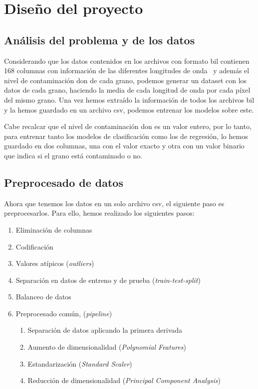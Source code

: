 \section{Diseño del proyecto}

\subsection{Análisis del problema y de los datos}\label{sec:obtencion}

Considerando que los datos contenidos en los archivos con formato \gls{bil} contienen 168 columnas con información de las diferentes longitudes de onda\ \cite{WhatIsHy18:online} y además el nivel de contaminación \gls{don} de cada grano, podemos generar un \gls{dataset} con los datos de cada grano, haciendo la media de cada longitud de onda por cada píxel del mismo grano. Una vez hemos extraído la información de todos los archivos \gls{bil} y la hemos guardado en un archivo \acrshort{csv}, podemos entrenar los modelos sobre este.

Cabe recalcar que el nivel de contaminación \gls{don} es un valor entero, por lo tanto, para entrenar tanto los modelos de clasificación como los de regresión, lo hemos guardado en dos columnas, una con el valor exacto y otra con un valor binario que indica si el grano está contaminado o no.

\subsection{Preprocesado de datos}\label{sec:preprocesado}

Ahora que tenemos los datos en un solo archivo \acrshort{csv}, el siguiente paso es preprocesarlos. Para ello, hemos realizado los siguientes pasos: 

\begin{enumerate}
    \item Eliminación de columnas
    \item Codificación
    \item Valores atípicos (\textit{outliers})
    \item Separación en datos de entreno y de prueba (\textit{train-test-split})
    \item Balanceo de datos
    \item Preprocesado común, (\textit{pipeline})
    \begin{enumerate}
        \item Separación de datos aplicando la primera derivada 
        \item Aumento de dimensionalidad (\textit{Polynomial Features})
        \item Estandarización  (\textit{Standard Scaler})
        \item Reducción de dimensionalidad (\textit{Principal Component Analysis})
    \end{enumerate}
    
\end{enumerate}


